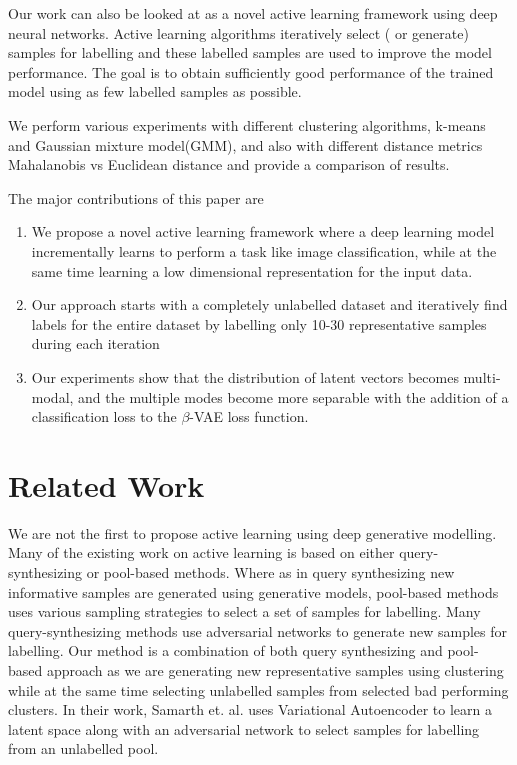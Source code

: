 \documentclass[runningheads]{llncs}
\begin{document}
Our work can also be looked at  as a novel  active learning framework using deep neural networks.
Active learning algorithms iteratively select ( or generate) samples for labelling and these labelled samples are used to improve the model performance.
The goal is to obtain sufficiently good performance of the trained model using as few labelled samples as possible.

We perform various experiments with different clustering algorithms,  k-means and Gaussian mixture model(GMM), and also with different distance metrics Mahalanobis vs Euclidean distance and provide a comparison of results.

The major contributions of this paper are
\begin{enumerate}
    \item We propose a novel active learning framework where a  deep learning model incrementally learns to perform a task like image classification, while at the same time learning a low dimensional representation for the input data.
    \item Our approach starts with a completely unlabelled dataset and iteratively find labels for the entire dataset by labelling only 10-30 representative samples during each iteration
    \item Our experiments show that the distribution of latent vectors becomes multi-modal, and the multiple modes become more separable with the addition of a classification loss to the $\beta$-VAE loss function\cite{beta_vae}.
\end{enumerate}

\section{Related Work}
We are not the first to propose active learning using deep generative modelling.
Many of the existing work on active learning is based on either query-synthesizing or  pool-based methods.
Where as in query synthesizing new informative samples are generated using generative models, pool-based methods\cite{wang_2016,beluch_2018} uses various sampling strategies to select a set of samples for labelling.
Many query-synthesizing methods use adversarial networks\cite{mahapatra_2018,mayer_2020} to generate new samples for labelling.
Our method is a combination of both query synthesizing and pool-based approach as we are generating new representative samples using clustering while at the same time selecting unlabelled samples from selected bad performing clusters.
In their work, Samarth et. al.\cite{vaal} uses Variational Autoencoder to learn a latent space along with an adversarial network to select samples for labelling from an unlabelled pool.
\end{document}
